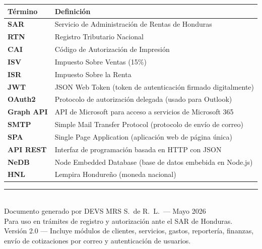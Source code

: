 \documentclass[12pt, letterpaper]{article}
\begin{document}
\begin{tabularx}{\linewidth}{>{\bfseries}l X}
  \toprule
  Término    & Definición                                                   \\
  \midrule
  SAR        & Servicio de Administración de Rentas de Honduras             \\
  RTN        & Registro Tributario Nacional                                 \\
  CAI        & Código de Autorización de Impresión                          \\
  ISV        & Impuesto Sobre Ventas (15\%)                                 \\
  ISR        & Impuesto Sobre la Renta                                      \\
  JWT        & JSON Web Token (token de autenticación firmado digitalmente) \\
  OAuth2     & Protocolo de autorización delegada (usado para Outlook)      \\
  Graph API  & API de Microsoft para acceso a servicios de Microsoft 365    \\
  SMTP       & Simple Mail Transfer Protocol (protocolo de envío de correo) \\
  SPA        & Single Page Application (aplicación web de página única)    \\
  API REST   & Interfaz de programación basada en HTTP con JSON             \\
  NeDB       & Node Embedded Database (base de datos embebida en Node.js)  \\
  HNL        & Lempira Hondureño (moneda nacional)                          \\
  \bottomrule
\end{tabularx}

\vspace{1cm}
\begin{center}
  \rule{0.5\linewidth}{0.5pt}\\[0.3cm]
  {\small Documento generado por DEVS MRS S.\ de R.\ L.\ --- Mayo 2026\\
  Para uso en trámites de registro y autorización ante el SAR de Honduras.\\
  Versión 2.0 --- Incluye módulos de clientes, servicios, gastos, reportería,
  finanzas, envío de cotizaciones por correo y autenticación de usuarios.}
\end{center}
\end{document}
